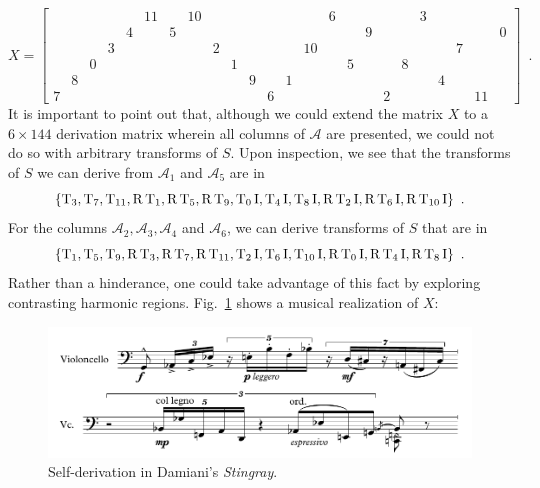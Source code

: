 \begin{example}
	\begin{equation}
    	X = \left[
    	\begin{array}{cccccccccccc|cccccccccccc}
    		&&&&& 11 && 10 &&&&&&& 6 &&&&& 3 &&&& \\
    		&&&& 4 && 5 &&&&&&&&&& 9 &&&&&&& 0 \\
    		&&& 3 &&&&& 2 &&&&& 10 &&&&&&&& 7 && \\
    		&& 0 &&&&&&& 1 &&&&&& 5 &&& 8 &&&&& \\
    		& 8 &&&&&&&&& 9 && 1 &&&&&&&& 4 &&& \\
    		7 &&&&&&&&&&& 6 &&&&&& 2 &&&&& 11 &
    	\end{array}
    	\right] \enspace.
	\end{equation}
	It is important to point out that, although we could extend the matrix $X$ to a $6 \times 144$ derivation matrix wherein all columns of $\mathcal{A}$ are presented, we could not do so with arbitrary transforms of $S$. Upon inspection, we see that the transforms of $S$ we can derive from $\mathcal{A}_1$ and $\mathcal{A}_5$ are in
	\begin{equation}
		\{ \operatorname{T}_3, \operatorname{T}_7, \operatorname{T}_{11}, \operatorname{R}\operatorname{T}_1, \operatorname{R}\operatorname{T}_5, \operatorname{R}\operatorname{T}_9, \operatorname{T}_0\operatorname{I}, \operatorname{T}_4\operatorname{I}, \operatorname{T}_8\operatorname{I}, \operatorname{R}\operatorname{T}_2\operatorname{I}, \operatorname{R}\operatorname{T}_6\operatorname{I}, \operatorname{R}\operatorname{T}_{10}\operatorname{I} \} \enspace.
	\end{equation}
	For the columns $\mathcal{A}_2, \mathcal{A}_3, \mathcal{A}_4$ and $\mathcal{A}_6$, we can derive transforms of $S$ that are in
	\begin{equation}
		\{ \operatorname{T}_1, \operatorname{T}_5, \operatorname{T}_9, \operatorname{R}\operatorname{T}_3, \operatorname{R}\operatorname{T}_7, \operatorname{R}\operatorname{T}_{11}, \operatorname{T}_2\operatorname{I}, \operatorname{T}_6\operatorname{I}, \operatorname{T}_{10}\operatorname{I}, \operatorname{R}\operatorname{T}_0\operatorname{I}, \operatorname{R}\operatorname{T}_4\operatorname{I}, \operatorname{R}\operatorname{T}_8\operatorname{I} \} \enspace.
	\end{equation}
	Rather than a hinderance, one could take advantage of this fact by exploring contrasting harmonic regions. Fig.~\ref{fig:stingray} shows a musical realization of $X$:
	\begin{figure}[htbp]
    	\centering
		\includegraphics[width=6.5in]{figures/stingray-example.pdf}
		\caption[Self-derivation in Damiani's \emph{Stingray}.]{Self-derivation in Damiani's \emph{Stingray}.}
    	\label{fig:stingray}
	\end{figure}
\end{example}

